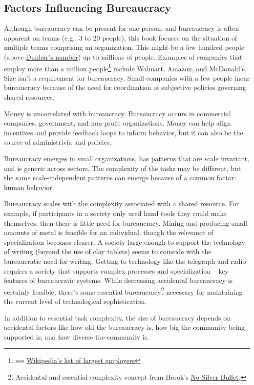 \subsection*{Factors Influencing Bureaucracy}

Although bureaucracy can be present for one person, and bureaucracy is often apparent on teams (e.g., 3 to 20 people), this book focuses on the situation of multiple teams comprising an organization. This might be a few hundred people (above \href{https://en.wikipedia.org/wiki/Dunbar's_number}{Dunbar's number}) up to millions of people. 
Examples of companies that employ more than a million people\footnote{see \href{https://en.wikipedia.org/wiki/List_of_largest_employers}{Wikipedia's list of largest employers}} include Walmart, Amazon, and McDonald's. Size isn't a requirement for bureaucracy. Small companies with a few people incur bureaucracy because of the need for coordination of subjective policies governing shared resources. 

Money is uncorrelated with bureaucracy. Bureaucracy occurs in commercial companies, government, and non-profit organizations. Money can help align incentives and provide feedback loops to inform behavior, but it can also be the source of administrivia and policies. 

Bureaucracy emerges in small organizations, has patterns that are scale invariant, and is generic across sectors. The complexity of the tasks may be different, but the same scale-independent patterns can emerge because of a common factor: human behavior.

Bureaucracy scales with the complexity associated with a shared resource. For example, if participants in a society only used hand tools they could make themselves, then there is little need for bureaucracy. Mining and producing small amounts of metal is feasible for an individual, though the relevance of specialization becomes clearer. A society large enough to support the technology of writing (beyond the use of clay tablets) seems to coincide with the bureaucratic need for writing. Getting to technology like the telegraph and radio requires a society that supports complex processes and specialization -- key features of bureaucratic systems. While decreasing accidental bureaucracy is certainly feasible, there's some essential bureaucracy\footnote{Accidental and essential complexity concept from Brook's \href{https://en.wikipedia.org/wiki/No_Silver_Bullet\#Summary}{No Silver Bullet}.} necessary for maintaining the current level of technological sophistication. 


In addition to essential task complexity, the size of bureaucracy depends on accidental factors like how old the bureaucracy is, how big the community being supported is, and how diverse the community is.


